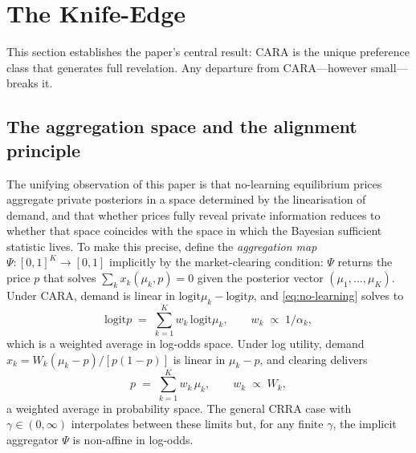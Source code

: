 \documentclass[12pt,letterpaper]{article}
\theoremstyle{definition}
\theoremstyle{remark}
\newcommand{\logit}{\mathrm{logit}}
\newcommand{\1}{\mathbf{1}}
\begin{document}
\section{The Knife-Edge}\label{sec:knife-edge}

This section establishes the paper's central result: CARA is the
unique preference class that generates full revelation. Any departure
from CARA---however small---breaks it.

\subsection{The aggregation space and the alignment principle}\label{sec:agg-space}

The unifying observation of this paper is that no-learning equilibrium prices
aggregate private posteriors in a space determined by the linearisation of
demand, and that whether prices fully reveal private information reduces to
whether that space coincides with the space in which the Bayesian sufficient
statistic lives. To make this precise, define the \emph{aggregation map}
$\Psi:[0,1]^{K}\to[0,1]$ implicitly by the market-clearing condition: $\Psi$
returns the price $p$ that solves $\sum_{k}x_{k}(\mu_{k},p)=0$ given the
posterior vector $(\mu_{1},\ldots,\mu_{K})$. Under CARA, demand is linear in
$\logit\mu_{k}-\logit p$, and \eqref{eq:no-learning} solves to
\begin{equation}
   \logit p \;=\; \sum_{k=1}^{K} w_{k}\,\logit\mu_{k},
   \qquad w_{k} \;\propto\; 1/\alpha_{k},
\label{eq:agg-cara}
\end{equation}
which is a weighted average in log-odds space. Under log utility, demand
$x_{k}=W_{k}(\mu_{k}-p)/[p(1-p)]$ is linear in $\mu_{k}-p$, and clearing
delivers
\begin{equation}
   p \;=\; \sum_{k=1}^{K} w_{k}\,\mu_{k},
   \qquad w_{k} \;\propto\; W_{k},
\label{eq:agg-log}
\end{equation}
a weighted average in probability space. The general CRRA case with
$\gamma\in(0,\infty)$ interpolates between these limits but, for any finite
$\gamma$, the implicit aggregator $\Psi$ is non-affine in log-odds.
\end{document}
